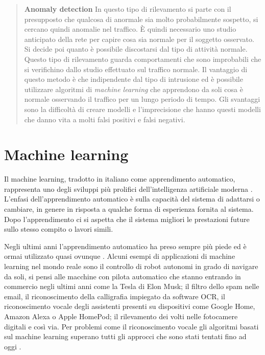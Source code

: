 \documentclass[../main.tex]{subfiles}
\begin{document}
\begin{verse}
				\textbf{Anomaly detection} In questo tipo di rilevamento si parte con il presupposto che qualcosa di anormale sia molto probabilmente sospetto, si cercano quindi anomalie nel traffico. È quindi necessario uno studio anticipato della rete per capire cosa sia normale per il soggetto osservato. Si decide poi quanto è possibile discostarsi dal tipo di attività normale. Questo tipo di rilevamento guarda comportamenti che sono improbabili che si verifichino dallo studio effettuato sul traffico normale.  
				Il vantaggio di questo metodo è che indipendente dal tipo di intrusione ed è possibile utilizzare algoritmi di \textit{machine learning} che apprendono da soli cosa è normale osservando il traffico per un lungo periodo di tempo.
				Gli svantaggi sono la difficoltà di creare modelli e l'imprecisione che hanno questi modelli che danno vita a molti falsi positivi e falsi negativi.
\end{verse}

\section{Machine learning}
Il machine learning, tradotto in italiano come apprendimento automatico, rappresenta uno degli sviluppi più prolifici dell'intelligenza artificiale moderna \cite{compIntelligence}. L'enfasi dell'apprendimento automatico è sulla capacità del sistema di adattarsi o cambiare, in genere in risposta a qualche forma di esperienza fornita al sistema. Dopo l'apprendimento ci si aspetta che il sistema migliori le prestazioni future sullo stesso compito o lavori simili. 

Negli ultimi anni l'apprendimento automatico ha preso sempre più piede ed è ormai utilizzato quasi ovunque \cite{compIntelligence}. Alcuni esempi di applicazioni di machine learning nel mondo reale sono il controllo di robot autonomi in grado di navigare da soli, si pensi alle macchine con pilota automatico che stanno entrando in commercio negli ultimi anni come la Tesla di Elon Musk; il filtro dello spam nelle email, il riconoscimento della calligrafia impiegato da software OCR, il riconoscimento vocale degli assistenti presenti su dispositivi come Google Home, Amazon Alexa o Apple HomePod; il rilevamento dei volti nelle fotocamere digitali e così via.
Per problemi come il riconoscimento vocale gli algoritmi basati sul machine learning superano tutti gli approcci che sono stati tentati fino ad oggi \cite{mldef}.
\end{document}
